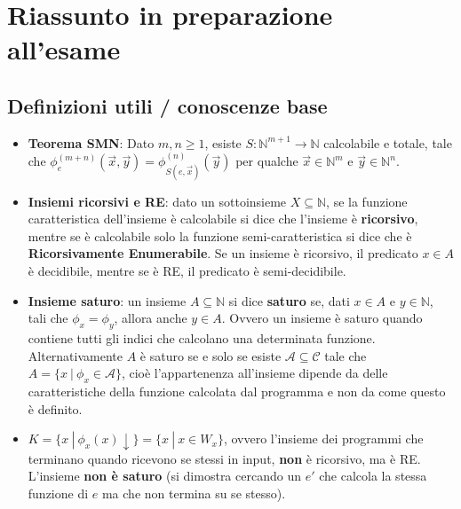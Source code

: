 
\chapter{Riassunto in preparazione all'esame}



\section{Definizioni utili / conoscenze base}

\begin{itemize}
	\item \textbf{Teorema SMN}: Dato $m,n \geq 1$, esiste $S : \mathbb{N}^{m+1} \rightarrow \mathbb{N}$ calcolabile e totale, tale che $\phi_{e}^{(m+n)}(\vec{x}, \vec{y}) =\phi_{S(e,\vec{x})}^{(n)}(\vec{y}) $ per qualche $\vec{x} \in \mathbb{N}^m$ e $\vec{y} \in \mathbb{N}^n$.
	
	\item \textbf{Insiemi ricorsivi e RE}: dato un sottoinsieme $X \subseteq \mathbb{N}$, se la funzione caratteristica dell'insieme è calcolabile si dice che l'insieme è \textbf{ricorsivo}, mentre se è calcolabile solo la funzione semi-caratteristica si dice che è \textbf{Ricorsivamente Enumerabile}. Se un insieme è ricorsivo, il predicato $x \in A$ è decidibile, mentre se è RE, il predicato è semi-decidibile.
	
	\item \textbf{Insieme saturo}: un insieme $A \subseteq \mathbb{N}$ si dice \textbf{saturo} se, dati $x \in A$ e $y \in \mathbb{N}$, tali che $\phi_x = \phi_y$, allora anche $y \in A$. Ovvero un insieme è saturo quando contiene tutti gli indici che calcolano una determinata funzione. Alternativamente $A$ è saturo se e solo se esiste $\mathcal{A} \subseteq \mathcal{C}$ tale che $A = \{ x \: | \: \phi_x \in \mathcal{A} \}$, cioè l'appartenenza all'insieme dipende da delle caratteristiche della funzione calcolata dal programma e non da come questo è definito.
	
	\item $K = \{ x \: | \: \phi_x(x) \downarrow \} = \{ x \: | \: x \in W_x \}$, ovvero l'insieme dei programmi che terminano quando ricevono se stessi in input, \textbf{non} è ricorsivo, ma è RE. L'insieme \textbf{non è saturo} (si dimostra cercando un $e'$ che calcola la stessa funzione di $e$ ma che non termina su se stesso).
	

\end{itemize}
